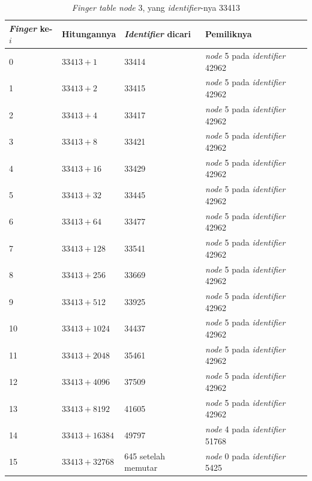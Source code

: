 \begin{table}[htbp]
  \centering
  \caption{\textit{Finger table} \textit{node} 3, yang \textit{identifier}-nya 33413}
  \label{tab:jari-node3}
  \begin{tabularx}{\textwidth}{|l|l|l|X|}
    \hline
    \textbf{\textit{Finger} ke-$i$} & \textbf{Hitungannya} & \textbf{\textit{Identifier} dicari} & \textbf{Pemiliknya} \\
    \hline
    0 & $33413 + 1$ & 33414 & \textit{node} 5 pada \textit{identifier} 42962 \\
    \hline
    1 & $33413 + 2$ & 33415 & \textit{node} 5 pada \textit{identifier} 42962 \\
    \hline
    2 & $33413 + 4$ & 33417 & \textit{node} 5 pada \textit{identifier} 42962 \\
    \hline
    3 & $33413 + 8$ & 33421 & \textit{node} 5 pada \textit{identifier} 42962 \\
    \hline
    4 & $33413 + 16$ & 33429 & \textit{node} 5 pada \textit{identifier} 42962 \\
    \hline
    5 & $33413 + 32$ & 33445 & \textit{node} 5 pada \textit{identifier} 42962 \\
    \hline
    6 & $33413 + 64$ & 33477 & \textit{node} 5 pada \textit{identifier} 42962 \\
    \hline
    7 & $33413 + 128$ & 33541 & \textit{node} 5 pada \textit{identifier} 42962 \\
    \hline
    8 & $33413 + 256$ & 33669 & \textit{node} 5 pada \textit{identifier} 42962 \\
    \hline
    9 & $33413 + 512$ & 33925 & \textit{node} 5 pada \textit{identifier} 42962 \\
    \hline
    10 & $33413 + 1024$ & 34437 & \textit{node} 5 pada \textit{identifier} 42962 \\
    \hline
    11 & $33413 + 2048$ & 35461 & \textit{node} 5 pada \textit{identifier} 42962 \\
    \hline
    12 & $33413 + 4096$ & 37509 & \textit{node} 5 pada \textit{identifier} 42962 \\
    \hline
    13 & $33413 + 8192$ & 41605 & \textit{node} 5 pada \textit{identifier} 42962 \\
    \hline
    14 & $33413 + 16384$ & 49797 & \textit{node} 4 pada \textit{identifier} 51768 \\
    \hline
    15 & $33413 + 32768$ & 645 setelah memutar & \textit{node} 0 pada \textit{identifier} 5425 \\
    \hline
  \end{tabularx}
\end{table}

